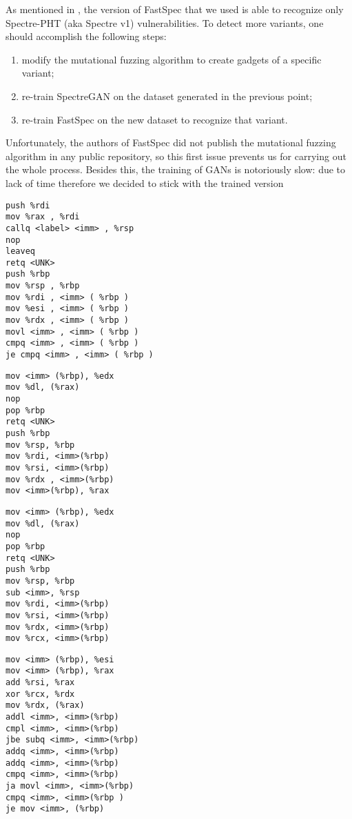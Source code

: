 \documentclass[12pt,a4paper]{book}
\theoremstyle{definition}
\begin{document}
	As mentioned in \cite{Tol2021}, the version of FastSpec that we used is able to recognize only Spectre-PHT (aka Spectre v1) vulnerabilities. To detect more variants, one should accomplish the following steps:
	\begin{enumerate}
		\item modify the mutational fuzzing algorithm to create gadgets of a specific variant;
		\item re-train SpectreGAN on the dataset generated in the previous point;
		\item re-train FastSpec on the new dataset to recognize that variant.
	\end{enumerate}
	Unfortunately, the authors of FastSpec did not publish the mutational fuzzing algorithm in any public repository, so this first issue prevents us for carrying out the whole process. Besides this, the training of GANs is notoriously slow: due to lack of time  therefore we decided to stick with the trained version 
	
	\begin{minipage}{.45\textwidth}
		\begin{lstlisting}[basicstyle=\footnotesize\ttfamily, caption={Window 369-379}, label=gadget1]
push %rdi
mov %rax , %rdi
callq <label> <imm> , %rsp
nop
leaveq
retq <UNK>
push %rbp
mov %rsp , %rbp
mov %rdi , <imm> ( %rbp )
mov %esi , <imm> ( %rbp )
mov %rdx , <imm> ( %rbp )
movl <imm> , <imm> ( %rbp )
cmpq <imm> , <imm> ( %rbp )
je cmpq <imm> , <imm> ( %rbp )
		\end{lstlisting}
	\end{minipage}\hfill
	\begin{minipage}{.45\textwidth}
		\begin{lstlisting}[caption={Window 7992-7997}, label=gadget2, numbers=right]
mov <imm> (%rbp), %edx
mov %dl, (%rax)
nop
pop %rbp
retq <UNK>
push %rbp
mov %rsp, %rbp
mov %rdi, <imm>(%rbp)
mov %rsi, <imm>(%rbp)
mov %rdx , <imm>(%rbp)
mov <imm>(%rbp), %rax
		\end{lstlisting}
	\end{minipage}
	
	\begin{minipage}{.45\textwidth}
		\begin{lstlisting}[caption={Window 11024-11031}, label=gadget3]
mov <imm> (%rbp), %edx
mov %dl, (%rax)
nop
pop %rbp
retq <UNK>
push %rbp
mov %rsp, %rbp
sub <imm>, %rsp
mov %rdi, <imm>(%rbp)
mov %rsi, <imm>(%rbp)
mov %rdx, <imm>(%rbp)
mov %rcx, <imm>(%rbp)
		\end{lstlisting}
	\end{minipage}\hfill
	\begin{minipage}{.45\textwidth}
		\begin{lstlisting}[basicstyle=\footnotesize\ttfamily, caption={Window 11351-11392}, label=gadget4, numbers=right]
mov <imm> (%rbp), %esi
mov <imm> (%rbp), %rax
add %rsi, %rax
xor %rcx, %rdx
mov %rdx, (%rax)
addl <imm>, <imm>(%rbp)
cmpl <imm>, <imm>(%rbp)
jbe subq <imm>, <imm>(%rbp)
addq <imm>, <imm>(%rbp)
addq <imm>, <imm>(%rbp)
cmpq <imm>, <imm>(%rbp)
ja movl <imm>, <imm>(%rbp)
cmpq <imm>, <imm>(%rbp )
je mov <imm>, (%rbp)
		\end{lstlisting}
	\end{minipage}
	
\end{document}
